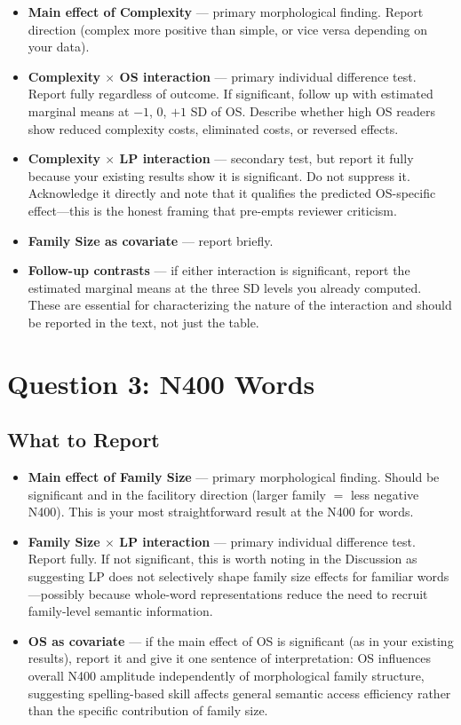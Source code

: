 \documentclass[12pt]{article}
\begin{document}
\begin{itemize}
    \item \textbf{Main effect of Complexity} --- primary morphological finding. Report direction (complex more positive than simple, or vice versa depending on your data).
    \item \textbf{Complexity $\times$ OS interaction} --- primary individual difference test. Report fully regardless of outcome. If significant, follow up with estimated marginal means at $-1$, $0$, $+1$ SD of OS. Describe whether high OS readers show reduced complexity costs, eliminated costs, or reversed effects.
    \item \textbf{Complexity $\times$ LP interaction} --- secondary test, but report it fully because your existing results show it is significant. Do not suppress it. Acknowledge it directly and note that it qualifies the predicted OS-specific effect---this is the honest framing that pre-empts reviewer criticism.
    \item \textbf{Family Size as covariate} --- report briefly.
    \item \textbf{Follow-up contrasts} --- if either interaction is significant, report the estimated marginal means at the three SD levels you already computed. These are essential for characterizing the nature of the interaction and should be reported in the text, not just the table.
\end{itemize}

\section*{Question 3: N400 Words}

\subsection*{What to Report}

\begin{itemize}
    \item \textbf{Main effect of Family Size} --- primary morphological finding. Should be significant and in the facilitory direction (larger family $=$ less negative N400). This is your most straightforward result at the N400 for words.
    \item \textbf{Family Size $\times$ LP interaction} --- primary individual difference test. Report fully. If not significant, this is worth noting in the Discussion as suggesting LP does not selectively shape family size effects for familiar words---possibly because whole-word representations reduce the need to recruit family-level semantic information.
    \item \textbf{OS as covariate} --- if the main effect of OS is significant (as in your existing results), report it and give it one sentence of interpretation: OS influences overall N400 amplitude independently of morphological family structure, suggesting spelling-based skill affects general semantic access efficiency rather than the specific contribution of family size.
\end{itemize}
\end{document}
